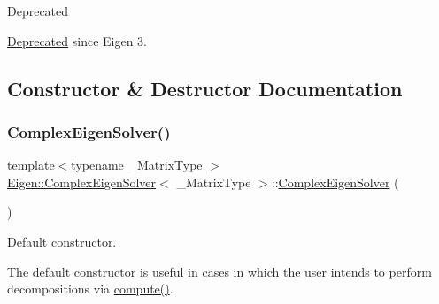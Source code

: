 \begin{DoxyRefDesc}{Deprecated}
\item[\mbox{\hyperlink{deprecated__deprecated000016}{Deprecated}}]since Eigen 3. \end{DoxyRefDesc}


\subsection{Constructor \& Destructor Documentation}
\mbox{\label{class_eigen_1_1_complex_eigen_solver_a3322a21574c61eefd450c003515ad802}} 
\subsubsection{\texorpdfstring{ComplexEigenSolver()}{ComplexEigenSolver()}\hspace{0.1cm}{\footnotesize\ttfamily [1/3]}}
{\footnotesize\ttfamily template$<$typename \+\_\+\+Matrix\+Type $>$ \\
\mbox{\hyperlink{class_eigen_1_1_complex_eigen_solver}{Eigen\+::\+Complex\+Eigen\+Solver}}$<$ \+\_\+\+Matrix\+Type $>$\+::\mbox{\hyperlink{class_eigen_1_1_complex_eigen_solver}{Complex\+Eigen\+Solver}} (\begin{DoxyParamCaption}{ }\end{DoxyParamCaption})\hspace{0.3cm}{\ttfamily [inline]}}



Default constructor. 

The default constructor is useful in cases in which the user intends to perform decompositions via \mbox{\hyperlink{class_eigen_1_1_complex_eigen_solver_aeb7e38c6db5369f5c974f3786e94c1f0}{compute()}}. \mbox{\label{class_eigen_1_1_complex_eigen_solver_a86751f64ebcd5c554551fb5eaaa02db7}} 
